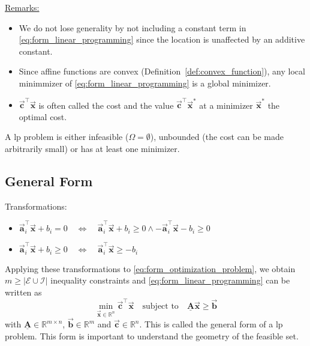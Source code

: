 \documentclass[9pt, headings=standardclasses, parskip=half]{scrartcl}
\renewcommand{\emph}[1]{\textcolor{mypurple}{#1}}
\newcommand{\matr}[1]{\underline{\boldsymbol{#1}}}
\newcommand{\vect}[1]{\vec{\boldsymbol{#1}}}
\newcommand{\R}{\mathbb{R}}
\begin{document}
\underline{Remarks:}
\begin{itemize}
\item We do not lose generality by not including a constant term in \eqref{eq:form_linear_programming} since the location is unaffected by an additive constant.
\item Since affine functions are convex (Definition~\ref{def:convex_function}), any local minimmizer of \eqref{eq:form_linear_programming} is a global minimizer.
\item \(\vect{c}^\top \vect{x}\) is often called the \emph{cost} and the value \(\vect{c}^\top \vect{x}^{\ast}\) at a minimizer \(\vect{x}^{\ast}\) the \emph{optimal cost}.
\end{itemize}

A \gls{lp} problem is either \emph{infeasible} ($\Omega = \emptyset$), \emph{unbounded} (the cost can be made arbitrarily small) or has \emph{at least one minimizer}.


\subsection{General Form}\label{sec:generalform_linear_programming}
Transformations:
\begin{itemize}
  \item \(\vect{a}_i^\top \vect{x} + b_i = 0    \quad \Longleftrightarrow \quad \vect{a}_i^\top \vect{x} + b_i \geq 0 \land -\vect{a}_i^\top \vect{x} - b_i \geq 0\)
  \item \(\vect{a}_i^\top \vect{x} + b_i \geq 0 \quad \Longleftrightarrow \quad \vect{a}_i^\top \vect{x} \geq -b_i\)
\end{itemize}
Applying these transformations to \eqref{eq:form_optimization_problem}, we obtain \(m \geq |\mathcal{E} \cup \mathcal{I}|\) inequality constraints and \eqref{eq:form_linear_programming} can be written as
\begin{equation}\label{eq:form_general_linear_programming}
  \boxed{
    \min_{\vect{x} \in \mathbb{R}^{n}} \vect{c}^\top \vect{x} \quad \text{subject to} \quad
    \matr{A} \vect{x} \geq \vect{b}
  }
\end{equation}
with \(\matr{A} \in \R^{m\times n}\), \(\vect{b} \in \R^{m}\) and \(\vect{c} \in \R^{n}\).
This is called the \emph{general form} of a \gls{lp} problem.
This form is important to understand the geometry of the feasible set.



\end{document}
